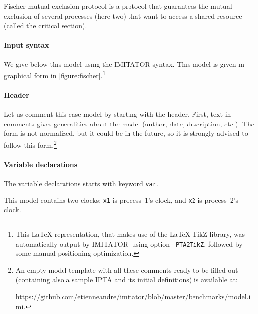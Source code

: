 \documentclass[a4paper,11pt]{report}
\newcommand{\imitator}{\textsf{IMITATOR}}
\newcommand{\IPTA}{IPTA}
\newcommand{\styleIMI}[1]{\textcolor{imicolor}{\texttt{#1}}}
\newcommand{\styleOption}[1]{\textcolor{optioncolor}{\texttt{#1}}}
\newcommand{\IncludeIMIfile}[1]{
	\lstset{language=Imitator}
	
}
\begin{document}
Fischer mutual exclusion protocol is a protocol that guarantees the mutual exclusion of several processes (here two) that want to access a shared resource (called the critical section).
% 

\paragraph{Input syntax}
We give below this model using the \imitator{} syntax.
This model is given in graphical form in \cref{figure:fischer}.\footnote{%
	This \LaTeX{} representation, that makes use of the \LaTeX{} TikZ library, was automatically output by \imitator{}, using option \styleOption{-PTA2TikZ}, followed by some manual positioning optimization.
}

\bigskip

\IncludeIMIfile{include/fischerPAT_obs.imi}




\paragraph{Header}
Let us comment this case model by starting with the header.
First, text in comments gives generalities about the model (author, date, description, etc.).
The form is not normalized, but it could be in the future, so it is strongly advised to follow this form.\footnote{%
	An empty model template with all these comments ready to be filled out (containing also a sample \IPTA{} and its initial definitions) is available at:
	
	\url{https://github.com/etienneandre/imitator/blob/master/benchmarks/model.imi}.
}

\paragraph{Variable declarations}
The variable declarations starts with keyword \styleIMI{var}.

This model contains two clocks: \styleIMI{x1} is process~1's clock, and \styleIMI{x2} is process~2's clock.
\end{document}
